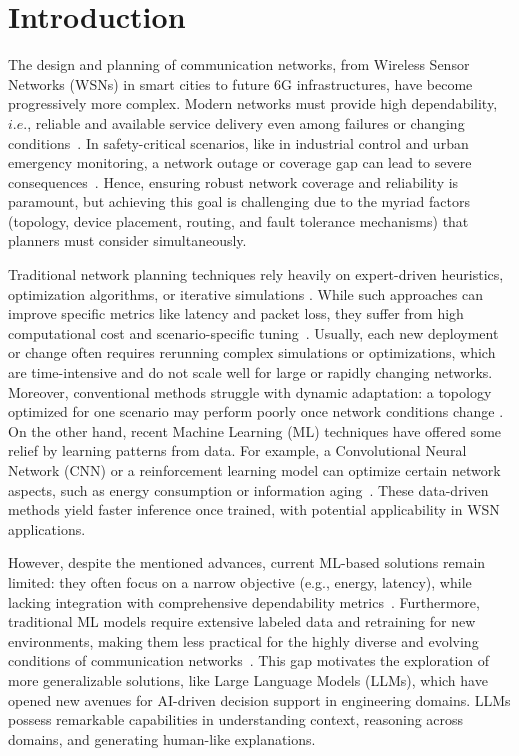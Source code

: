 \section{Introduction}
\label{sec:introduction}

The design and planning of communication networks, from Wireless Sensor Networks (WSNs) in smart cities to future 6G infrastructures, have become progressively more complex. Modern networks must provide high dependability, $i.e.$, reliable and available service delivery even among failures or changing conditions~\cite{surveyDependability1,surveyDependability2}. In safety-critical scenarios, like in industrial control and urban emergency monitoring, a network outage or coverage gap can lead to severe consequences~\cite{surveyCoverage1,Jesus2024}. Hence, ensuring robust network coverage and reliability is paramount, but achieving this goal is challenging due to the myriad factors (topology, device placement, routing, and fault tolerance mechanisms) that planners must consider simultaneously. 


Traditional network planning techniques rely heavily on expert-driven heuristics, optimization algorithms, or iterative simulations \cite{surveyHeuristics}. While such approaches can improve specific metrics like latency and packet loss, they suffer from high computational cost and scenario-specific tuning~\cite{surveySwarm}. Usually, each new deployment or change often requires rerunning complex simulations or optimizations, which are time-intensive and do not scale well for large or rapidly changing networks. Moreover, conventional methods struggle with dynamic adaptation: a topology optimized for one scenario may perform poorly once network conditions change \cite{surveyAdaptive}. On the other hand, recent Machine Learning (ML) techniques have offered some relief by learning patterns from data. For example, a Convolutional Neural Network (CNN) or a reinforcement learning model can optimize certain network aspects, such as energy consumption or information aging~\cite{surveyML1}. These data-driven methods yield faster inference once trained, with potential applicability in WSN applications. 

However, despite the mentioned advances, current ML-based solutions remain limited: they often focus on a narrow objective (e.g., energy, latency), while lacking integration with comprehensive dependability metrics~\cite{surveyML2}. Furthermore, traditional ML models require extensive labeled data and retraining for new environments, making them less practical for the highly diverse and evolving conditions of communication networks~\cite{DepML2025}. This gap motivates the exploration of more generalizable solutions, like Large Language Models (LLMs), which have opened new avenues for AI-driven decision support in engineering domains. LLMs possess remarkable capabilities in understanding context, reasoning across domains, and generating human-like explanations. 

